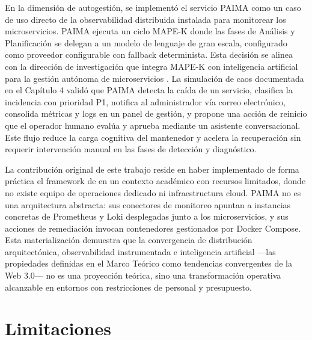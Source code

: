 En la dimensión de autogestión, se implementó el servicio PAIMA como un caso de uso
directo de la observabilidad distribuida instalada para monitorear los
microservicios. PAIMA ejecuta un ciclo MAPE-K donde las fases de Análisis y
Planificación se delegan a un modelo de lenguaje de gran escala, configurado como
proveedor configurable con fallback determinista. Esta decisión se alinea con la
dirección de investigación que integra MAPE-K con inteligencia artificial para la
gestión autónoma de microservicios \cite{esposito2025mapek}. La simulación de caos documentada en el Capítulo 4
validó que PAIMA detecta la caída de un servicio, clasifica la incidencia con
prioridad P1, notifica al administrador vía correo electrónico, consolida métricas
y logs en un panel de gestión, y propone una acción de reinicio que el operador
humano evalúa y aprueba mediante un asistente conversacional. Este flujo reduce la
carga cognitiva del mantenedor y acelera la recuperación sin requerir intervención
manual en las fases de detección y diagnóstico.

La contribución original de este trabajo reside en haber implementado de forma
práctica el framework de \cite{esposito2025mapek} en un contexto académico con
recursos limitados, donde no existe equipo de operaciones dedicado ni
infraestructura cloud. PAIMA no es una arquitectura abstracta: sus conectores de
monitoreo apuntan a instancias concretas de Prometheus y Loki desplegadas junto a
los microservicios, y sus acciones de remediación invocan contenedores gestionados
por Docker Compose. Esta materialización demuestra que la convergencia de
distribución arquitectónica, observabilidad instrumentada e inteligencia artificial
---las propiedades definidas en el Marco Teórico como tendencias convergentes de la
Web 3.0--- no es una proyección teórica, sino una transformación operativa alcanzable
en entornos con restricciones de personal y presupuesto.

\section{Limitaciones}

